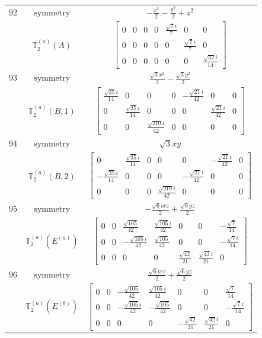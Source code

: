 \documentclass[fleqn,8pt,landscape]{jsarticle}
\begin{document}
\begin{longtable}{ccc}
$ 92 $ & $ \text{symmetry} $ & $ - \frac{x^{2}}{2} - \frac{y^{2}}{2} + z^{2} $ \\
$  $ & $ \mathbb{T}_{2}^{(a)}(A) $ & $ \begin{bmatrix} 0 & 0 & 0 & 0 & \frac{\sqrt{7} i}{7} & 0 & 0 \\ 0 & 0 & 0 & 0 & 0 & \frac{\sqrt{7} i}{7} & 0 \\ 0 & 0 & 0 & 0 & 0 & 0 & \frac{\sqrt{42} i}{14} \end{bmatrix} $ \\ \hline
$ 93 $ & $ \text{symmetry} $ & $ \frac{\sqrt{3} x^{2}}{2} - \frac{\sqrt{3} y^{2}}{2} $ \\
$  $ & $ \mathbb{T}_{2}^{(a)}(B,1) $ & $ \begin{bmatrix} \frac{\sqrt{35} i}{14} & 0 & 0 & 0 & - \frac{\sqrt{21} i}{42} & 0 & 0 \\ 0 & \frac{\sqrt{35} i}{14} & 0 & 0 & 0 & \frac{\sqrt{21} i}{42} & 0 \\ 0 & 0 & \frac{\sqrt{210} i}{42} & 0 & 0 & 0 & 0 \end{bmatrix} $ \\ \hline
$ 94 $ & $ \text{symmetry} $ & $ \sqrt{3} x y $ \\
$  $ & $ \mathbb{T}_{2}^{(a)}(B,2) $ & $ \begin{bmatrix} 0 & \frac{\sqrt{35} i}{14} & 0 & 0 & 0 & - \frac{\sqrt{21} i}{42} & 0 \\ - \frac{\sqrt{35} i}{14} & 0 & 0 & 0 & - \frac{\sqrt{21} i}{42} & 0 & 0 \\ 0 & 0 & 0 & \frac{\sqrt{210} i}{42} & 0 & 0 & 0 \end{bmatrix} $ \\ \hline
$ 95 $ & $ \text{symmetry} $ & $ - \frac{\sqrt{6} i x z}{2} + \frac{\sqrt{6} y z}{2} $ \\
$  $ & $ \mathbb{T}_{2}^{(a)}(E^{(a)}) $ & $ \begin{bmatrix} 0 & 0 & \frac{\sqrt{105}}{42} & \frac{\sqrt{105} i}{42} & 0 & 0 & - \frac{\sqrt{7}}{14} \\ 0 & 0 & - \frac{\sqrt{105} i}{42} & \frac{\sqrt{105}}{42} & 0 & 0 & - \frac{\sqrt{7} i}{14} \\ 0 & 0 & 0 & 0 & \frac{\sqrt{42}}{21} & \frac{\sqrt{42} i}{21} & 0 \end{bmatrix} $ \\ \hline
$ 96 $ & $ \text{symmetry} $ & $ \frac{\sqrt{6} i x z}{2} + \frac{\sqrt{6} y z}{2} $ \\
$  $ & $ \mathbb{T}_{2}^{(a)}(E^{(b)}) $ & $ \begin{bmatrix} 0 & 0 & - \frac{\sqrt{105}}{42} & \frac{\sqrt{105} i}{42} & 0 & 0 & \frac{\sqrt{7}}{14} \\ 0 & 0 & - \frac{\sqrt{105} i}{42} & - \frac{\sqrt{105}}{42} & 0 & 0 & - \frac{\sqrt{7} i}{14} \\ 0 & 0 & 0 & 0 & - \frac{\sqrt{42}}{21} & \frac{\sqrt{42} i}{21} & 0 \end{bmatrix} $ \\ \hline

\end{longtable}
\end{document}

